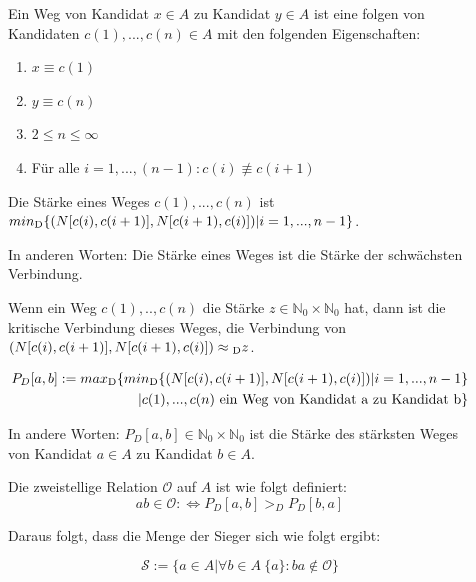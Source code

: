 \begin{description}
\item[]  Ein Weg von Kandidat $x \in A$ zu Kandidat $y \in A$ ist eine folgen von Kandidaten $c(1),...,c(n) \in A$ mit den folgenden Eigenschaften:

\begin{center}
\begin{enumerate}
\item $x \equiv c(1)$
\item $y \equiv c(n)$
\item $2 \leq n \leq \infty$
\item Für alle $ i = 1,...,(n-1): c(i) \not\equiv c(i+1)$
\end{enumerate}
\end{center}


\item[]
Die Stärke eines Weges $c(1),...,c(n)$ ist $ min\textsubscript{D} \{(N[c(i),c(i+1)],N[c(i+1),c(i)])| i=1,...,n-1\} $.

In anderen Worten: Die Stärke eines Weges ist die Stärke der schwächsten Verbindung.

\item[]
Wenn ein Weg $c(1),..,c(n)$ die Stärke $z \in  \mathbb{N}_{0} \times \mathbb{N}_{0}$ hat, dann ist die kritische Verbindung dieses Weges, die Verbindung von  $(N[c(i),c(i+1)],N[c(i+1),c(i)]) \approx \textsubscript{D}z$.

\begin{align}
P_{D}[a,b] := max\textsubscript{D}\{ min\textsubscript{D} \{(N[c(i),c(i+1)],N[c(i+1),c(i)])| i=1,...,n-1\} \nonumber \\
     |c(1),...,c(n) \text{ ein Weg von Kandidat a zu Kandidat b}\} \nonumber
\end{align}

In andere Worten: $P_{D}[a,b] \in \mathbb{N}_{0} \times \mathbb{N}_{0}$ ist die Stärke des stärksten Weges von Kandidat $a \in A$ zu Kandidat $b \in A$.

\item[]Die zweistellige Relation $\mathcal{O}$ auf $A$ ist wie folgt definiert:
\[
ab \in \mathcal{O} : \Leftrightarrow P_{D}[a,b]>_{D}P_{D}[b,a]
\]
\item[] Daraus folgt, dass die Menge der Sieger sich wie folgt ergibt:

\[
\mathcal{S} := \{ a \in A | \forall b \in A \ \{a\}: ba \not\in \mathcal{O} \}
\]

\end{description}



